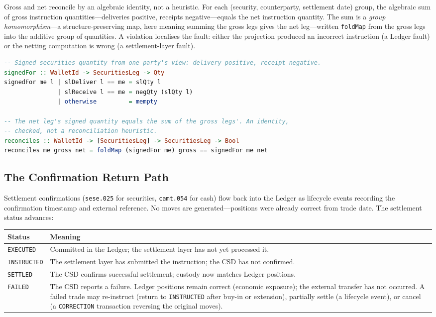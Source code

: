 Gross and net reconcile by an algebraic identity, not a heuristic. For each (security, counterparty, settlement date) group, the algebraic sum of gross instruction quantities---deliveries positive, receipts negative---equals the net instruction quantity. The sum is a \emph{group homomorphism}---a structure-preserving map, here meaning summing the gross legs gives the net leg---written \texttt{foldMap} from the gross legs into the additive group of quantities. A violation localises the fault: either the projection produced an incorrect instruction (a Ledger fault) or the netting computation is wrong (a settlement-layer fault).

\begin{lstlisting}[language=Haskell]
-- Signed securities quantity from one party's view: delivery positive, receipt negative.
signedFor :: WalletId -> SecuritiesLeg -> Qty
signedFor me l | slDeliver l == me = slQty l
               | slReceive l == me = negQty (slQty l)
               | otherwise         = mempty

-- The net leg's signed quantity equals the sum of the gross legs'. An identity,
-- checked, not a reconciliation heuristic.
reconciles :: WalletId -> [SecuritiesLeg] -> SecuritiesLeg -> Bool
reconciles me gross net = foldMap (signedFor me) gross == signedFor me net
\end{lstlisting}

\subsection{The Confirmation Return Path}
\label{sec:settlement-confirmation}

Settlement confirmations (\texttt{sese.025} for securities, \texttt{camt.054} for cash) flow back into the Ledger as lifecycle events recording the confirmation timestamp and external reference. No moves are generated---positions were already correct from trade date. The settlement status advances:

\begin{center}
\begin{tabular}{l p{10.5cm}}
\toprule
\textbf{Status} & \textbf{Meaning} \\
\midrule
\texttt{EXECUTED}   & Committed in the Ledger; the settlement layer has not yet processed it. \\
\texttt{INSTRUCTED} & The settlement layer has submitted the instruction; the CSD has not confirmed. \\
\texttt{SETTLED}    & The CSD confirms successful settlement; custody now matches Ledger positions. \\
\texttt{FAILED}     & The CSD reports a failure. Ledger positions remain correct (economic exposure); the external transfer has not occurred. A failed trade may re-instruct (return to \texttt{INSTRUCTED} after buy-in or extension), partially settle (a lifecycle event), or cancel (a \texttt{CORRECTION} transaction reversing the original moves). \\
\bottomrule
\end{tabular}
\end{center}

